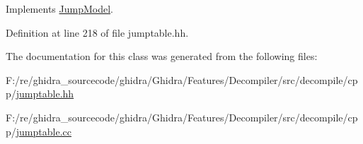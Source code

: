 Implements \mbox{\hyperlink{class_jump_model_a76a52bf3311e9d97a61d1117f6de1b0a}{Jump\+Model}}.



Definition at line 218 of file jumptable.\+hh.



The documentation for this class was generated from the following files\+:\begin{DoxyCompactItemize}
\item 
F\+:/re/ghidra\+\_\+sourcecode/ghidra/\+Ghidra/\+Features/\+Decompiler/src/decompile/cpp/\mbox{\hyperlink{jumptable_8hh}{jumptable.\+hh}}\item 
F\+:/re/ghidra\+\_\+sourcecode/ghidra/\+Ghidra/\+Features/\+Decompiler/src/decompile/cpp/\mbox{\hyperlink{jumptable_8cc}{jumptable.\+cc}}\end{DoxyCompactItemize}
